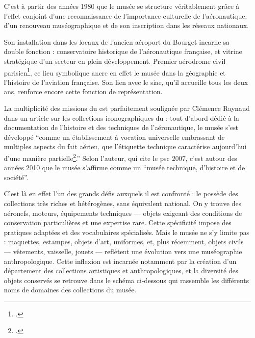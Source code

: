 C’est à partir des années 1980 que le musée se structure véritablement grâce à l’effet conjoint d’une reconnaissance de l’importance culturelle de l’aéronautique, d’un renouveau muséographique et de son inscription dans les réseaux nationaux. 

Son installation dans les locaux de l'ancien aéroport du Bourget incarne sa double fonction : conservatoire historique de l'aéronautique française, et vitrine stratégique d'un secteur en plein développement. Premier aérodrome civil parisien\footcite{terrierAeroportParisBourget2019}, ce lieu symbolique ancre en effet le musée dans la géographie et l’histoire de l’aviation française. Son lien avec le \ac{siae}, qu’il accueille tous les deux ans, renforce encore cette fonction de représentation.

La multiplicité des missions du \mae est parfaitement soulignée par Clémence Raynaud dans un article sur les collections iconographiques du \mae : tout d'abord dédié à la documentation de l'histoire et des techniques de l'aéronautique, le musée s'est développé \enquote{comme un établissement à vocation universelle embrassant de multiples aspects du fait aérien, que l’étiquette technique caractérise aujourd’hui d’une manière partielle\footcite{raynaudMuseeTechniqueDhistoire2018}.} Selon l'auteur, qui cite le \ac{psc} 2007, c'est autour des années 2010 que le musée s'affirme comme un \enquote{musée technique, d’histoire et de société}.

C'est là en effet l'un des grands défis auxquels il est confronté : le \mae possède des collections très riches et hétérogènes, sans équivalent national. On y trouve des aéronefs, moteurs, équipements techniques — objets exigeant des conditions de conservation particulières et une expertise rare. Cette spécificité impose des pratiques adaptées et des vocabulaires spécialisés. Mais le musée ne s’y limite pas : maquettes, estampes, objets d’art, uniformes, et, plus récemment, objets civils — vêtements, vaisselle, jouets — reflètent une évolution vers une muséographie anthropologique. Cette inflexion est incarnée notamment par la création d'un département des collections artistiques et anthropologiques, et la diversité des objets conservés se retrouve dans le schéma ci-dessous qui rassemble les différents noms de domaines des collections du musée.

